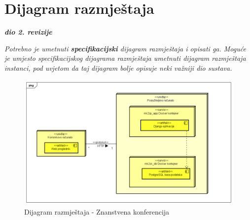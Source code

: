 		
		\section{Dijagram razmještaja}
			
			\textbf{\textit{dio 2. revizije}}
			
			 \textit{Potrebno je umetnuti \textbf{specifikacijski} dijagram razmještaja i opisati ga. Moguće je umjesto specifikacijskog dijagrama razmještaja umetnuti dijagram razmještaja instanci, pod uvjetom da taj dijagram bolje opisuje neki važniji dio sustava.}
			 
			 
			\begin{figure}[H]
			 	\includegraphics[width= 15 cm, height= 25 cm, keepaspectratio]{dijagrami/Diagram razmjestaja.png} 
			 	\centering
			 	\caption{Dijagram razmještaja - Znanstvena konferencija}
			 	\label{fig:act5}
			 \end{figure}
			
